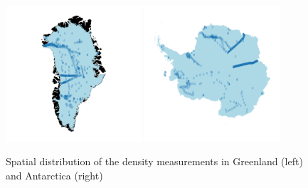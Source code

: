 \documentclass[journal abbreviation, manuscript]{copernicus}
\begin{document}
\begin{figure}[!htb]
\caption{Spatial distribution of the density measurements in Greenland (left) and Antarctica (right)}
\centering
\includegraphics[width=0.45\textwidth]{figures/density_map_greenland.png}
\includegraphics[width=0.45\textwidth]{figures/density_map_antarctica.png}
\end{figure}
\end{document}
